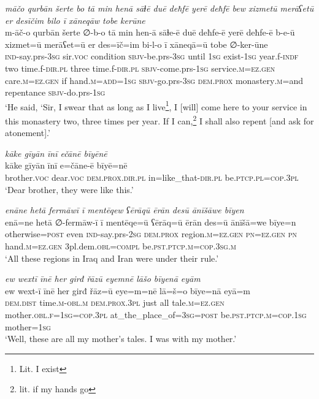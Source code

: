 \ea \label{ŠJ.98}
\textit{māčo qurbān šerte bo tā min henā sāɫē duē deħfē yerē deħfē bew xizmetū merāʕetū er desīčim bilo ī xāneqāw tobe kerūne} \\ 
\gll m-āč-o qurbān šerte ∅-b-o tā min hen-ā sāɫe-ē duē deħfe-ē yerē deħfe-ē b-e-ū xizmet=ū merāʕet=ū er des=īč=im bi-l-o ī xāneqā=ū tobe ∅-ker-ūne \\ 
 \textsc{ind-}say.prs\textsc{-3sg} sir.\textsc{voc} condition \textsc{sbjv-}be.prs\textsc{-3sg} until \textsc{1sg} exist\textsc{-\textsc{1sg}} year.f\textsc{-indf} two time.f\textsc{-dir}\textsc{.pl} three time.f\textsc{-dir}\textsc{.pl} \textsc{sbjv-}come.prs\textsc{-\textsc{1sg}} service\textsc{.m}\textsc{=ez.gen} care\textsc{.m}\textsc{=ez.gen} if hand\textsc{.m}\textsc{=add}\textsc{=\textsc{1sg}} \textsc{sbjv-}go.prs\textsc{-3sg} \textsc{dem.prox} monastery\textsc{.m}=and repentance \textsc{sbjv-}do.prs\textsc{-\textsc{1sg}} \\ 
\glt `He said, ‘Sir, I swear that as long as I live\footnote{Lit. I exist}, I [will] come here to your service in this monastery two, three times per year. If I can,\footnote{lit. if my hands go} I shall also repent [and ask for atonement].'
\z 
 
\ea \label{ŠJ.99}
\textit{kāke gīyān īnī ečānē bīyēnē} \\ 
\gll kāke gīyān īnī e=čāne-ē bīyē=nē \\ 
 brother.\textsc{voc} dear.\textsc{voc} \textsc{dem.prox}\textsc{.dir}\textsc{.pl} in=like\_that\textsc{-dir}\textsc{.pl} be\textsc{.ptcp}\textsc{.pl}\textsc{=cop}\textsc{.3pl} \\ 
\glt `Dear brother, they were like this.'
\z 
 
\ea \label{ŠJ.102}
\textit{enāne hetā fermāwī ī mentēqew ʕērāqū ērān desū ānīšāwe bīyen} \\ 
\gll enā=ne hetā ∅-fermāw-ī ī mentēqe=ū ʕērāq=ū ērān des=ū ānīšā=we bīye=n \\ 
 otherwise\textsc{=\textsc{post}} even \textsc{ind-}say.prs-\textsc{2sg} \textsc{dem.prox} region\textsc{.m}\textsc{=ez.gen} \textsc{pn}\textsc{=ez.gen} \textsc{pn} hand\textsc{.m}\textsc{=ez.gen} 3pl.dem\textsc{.obl}\textsc{=compl} be\textsc{.pst}\textsc{.ptcp}\textsc{.m}\textsc{=cop}\textsc{.3sg}\textsc{.m} \\ 
\glt `All these regions in Iraq and Iran were under their rule.'
\z 
 
\ea \label{KŠ.1}
\textit{ew wextī īnē her girđ řāzū eyemnē lāšo bīyenā eyām} \\ 
\gll ew wext-ī īnē her girđ řāz=ū eye=m=nē lā=š=o bīye=nā eyā=m \\ 
 \textsc{dem.dist} time\textsc{.m}\textsc{-obl}\textsc{.m} \textsc{dem.prox}\textsc{.3pl} just all tale\textsc{.m}\textsc{=ez.gen} mother\textsc{.obl}\textsc{.f}\textsc{=\textsc{1sg}}\textsc{=cop}\textsc{.3pl} at\_the\_place\_of\textsc{=3sg}\textsc{=\textsc{post}} be\textsc{.pst}\textsc{.ptcp}\textsc{.m}\textsc{=cop}\textsc{.\textsc{1sg}} mother\textsc{=\textsc{1sg}} \\ 
\glt `Well, these are all my mother’s tales. I was with my mother.'
\z 
 
